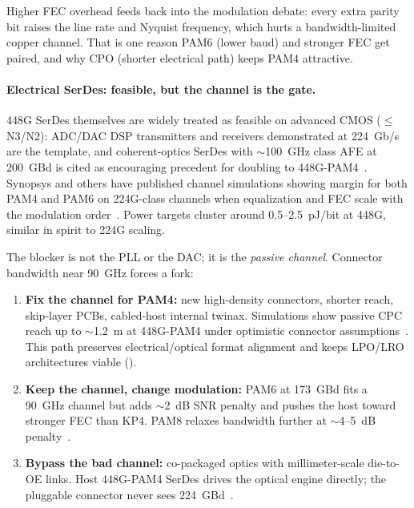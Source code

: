 Higher FEC overhead feeds back into the modulation debate: every extra parity bit
raises the line rate and Nyquist frequency, which hurts a bandwidth-limited copper
channel. That is one reason PAM6 (lower baud) and stronger FEC get paired, and why
CPO (shorter electrical path) keeps PAM4 attractive.

\paragraph{Electrical SerDes: feasible, but the channel is the gate.}

448G SerDes themselves are widely treated as feasible on advanced CMOS
($\le$N3/N2): ADC/DAC DSP transmitters and receivers demonstrated at 224~Gb/s are
the template, and coherent-optics SerDes with $\sim$100~GHz class AFE at 200~GBd
is cited as encouraging precedent for doubling to 448G-PAM4~. Synopsys
and others have published channel simulations showing margin for both PAM4 and PAM6
on 224G-class channels when equalization and FEC scale with the modulation
order~. Power targets cluster around 0.5--2.5~pJ/bit at 448G,
similar in spirit to 224G scaling.

The blocker is not the PLL or the DAC; it is the \emph{passive channel}. Connector
bandwidth near 90~GHz forces a fork:

\begin{enumerate}
  \item \textbf{Fix the channel for PAM4:} new high-density connectors, shorter
        reach, skip-layer PCBs, cabled-host internal twinax. Simulations show
        passive CPC reach up to $\sim$1.2~m at 448G-PAM4 under optimistic
        connector assumptions~. This path preserves electrical/optical
        format alignment and keeps LPO/LRO architectures viable ().
  \item \textbf{Keep the channel, change modulation:} PAM6 at 173~GBd fits a
        90~GHz channel but adds $\sim$2~dB SNR penalty and pushes the host toward
        stronger FEC than KP4. PAM8 relaxes bandwidth further at $\sim$4--5~dB
        penalty~.
  \item \textbf{Bypass the bad channel:} co-packaged optics with millimeter-scale
        die-to-OE links. Host 448G-PAM4 SerDes drives the optical engine directly;
        the pluggable connector never sees 224~GBd~.
\end{enumerate}

